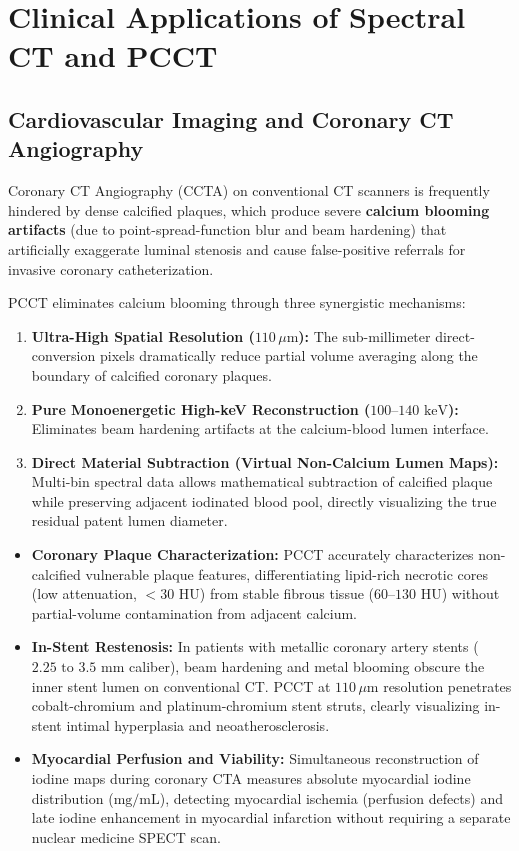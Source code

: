 \documentclass[11pt,a4paper]{article}
\begin{document}
\section{Clinical Applications of Spectral CT and PCCT}

\subsection{Cardiovascular Imaging and Coronary CT Angiography}
Coronary CT Angiography (CCTA) on conventional CT scanners is frequently hindered by dense calcified plaques, which produce severe \textbf{calcium blooming artifacts} (due to point-spread-function blur and beam hardening) that artificially exaggerate luminal stenosis and cause false-positive referrals for invasive coronary catheterization.

\begin{physicsbox}
PCCT eliminates calcium blooming through three synergistic mechanisms:
\begin{enumerate}
    \item \textbf{Ultra-High Spatial Resolution ($110\,\mu\text{m}$):} The sub-millimeter direct-conversion pixels dramatically reduce partial volume averaging along the boundary of calcified coronary plaques.
    \item \textbf{Pure Monoenergetic High-keV Reconstruction ($100\text{--}140\text{ keV}$):} Eliminates beam hardening artifacts at the calcium-blood lumen interface.
    \item \textbf{Direct Material Subtraction (Virtual Non-Calcium Lumen Maps):} Multi-bin spectral data allows mathematical subtraction of calcified plaque while preserving adjacent iodinated blood pool, directly visualizing the true residual patent lumen diameter.
\end{enumerate}
\end{physicsbox}

\begin{itemize}[leftmargin=2em]
    \item \textbf{Coronary Plaque Characterization:} PCCT accurately characterizes non-calcified vulnerable plaque features, differentiating lipid-rich necrotic cores (low attenuation, $< 30\text{ HU}$) from stable fibrous tissue ($60\text{--}130\text{ HU}$) without partial-volume contamination from adjacent calcium.
    \item \textbf{In-Stent Restenosis:} In patients with metallic coronary artery stents ($2.25\text{ to }3.5\text{ mm}$ caliber), beam hardening and metal blooming obscure the inner stent lumen on conventional CT. PCCT at $110\,\mu\text{m}$ resolution penetrates cobalt-chromium and platinum-chromium stent struts, clearly visualizing in-stent intimal hyperplasia and neoatherosclerosis.
    \item \textbf{Myocardial Perfusion and Viability:} Simultaneous reconstruction of iodine maps during coronary CTA measures absolute myocardial iodine distribution ($\text{mg/mL}$), detecting myocardial ischemia (perfusion defects) and late iodine enhancement in myocardial infarction without requiring a separate nuclear medicine SPECT scan.
\end{itemize}
\end{document}
